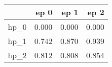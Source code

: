 \begin{tabular}{lrrr}
\toprule
{} &   ep 0 &   ep 1 &   ep 2 \\
\midrule
hp\_0 &  0.000 &  0.000 &  0.000 \\
hp\_1 &  0.742 &  0.870 &  0.939 \\
hp\_2 &  0.812 &  0.808 &  0.854 \\
\bottomrule
\end{tabular}
